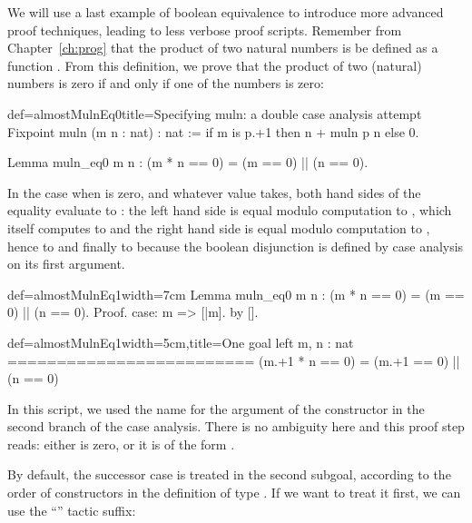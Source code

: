 We will use a last example of boolean equivalence to introduce more
advanced proof techniques, leading to less verbose proof
scripts. Remember from Chapter~\ref{ch:prog} that the product of two
natural numbers is be defined as a function
. From this definition, we prove that
the product of two (natural) numbers is zero if and only if one of the
numbers is zero:

\begin{coq}{def=almostMulnEq0}{title=Specifying muln: a double case analysis attempt}
Fixpoint muln (m n : nat) : nat :=
  if m is p.+1 then n + muln p n else 0.

Lemma muln_eq0 m n : (m * n == 0) = (m == 0) || (n == 0).
\end{coq}
In the case when  is zero, and whatever value  takes, both
hand sides of the equality evaluate to : the left hand side is
equal modulo computation to , which itself computes to
 and the right hand side is equal modulo computation to
, hence to  and finally to
 because the boolean disjunction \C{(_ || _)} is defined by
case analysis on its first argument.

\begin{coq}{def=almostMulnEq1}{width=7cm}
Lemma muln_eq0 m n :
  (m * n == 0) = (m == 0) || (n == 0).
Proof.
case: m => [|m].
  by [].
\end{coq}
\begin{coqout}{def=almostMulnEq1}{width=5cm,title=One goal left}
m, n : nat
=========================
(m.+1 * n == 0) =
  (m.+1 == 0) || (n == 0)
\end{coqout}
In this script, we used the name  for the argument of the
constructor in the second branch of the case analysis. There is no
ambiguity here and this proof step reads: either  is zero, or it
is of the form .

By default, the successor case is treated in the second subgoal,
according to the order of constructors in the definition of type
. If we want to treat it first, we can use the ``'' tactic suffix:

